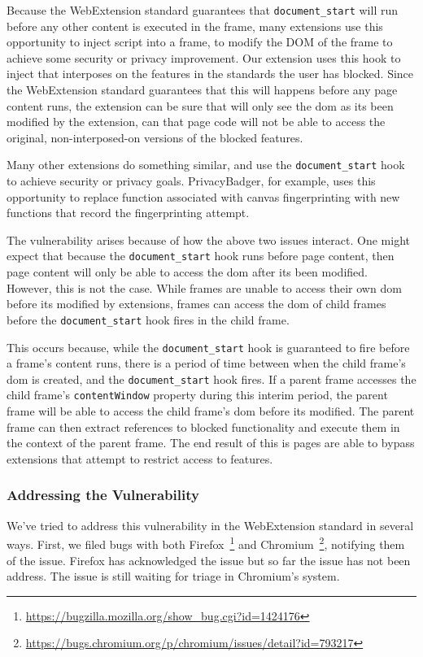 Because the WebExtension standard guarantees that \texttt{document\_start} will
run before any other content is executed in the frame, many extensions use
this opportunity to inject script into a frame, to modify the DOM of the frame
to achieve some security or privacy improvement.  Our extension uses this
hook to inject \JS that interposes on the features in the standards the user
has blocked.  Since the WebExtension standard guarantees that this will happens
before any page content runs, the extension can be sure that will only see
the \gls{dom} as its been modified by the extension, can that page code
will not be able to access the original, non-interposed-on versions of the
blocked features.

Many other extensions do something similar, and use the \texttt{document\_start}
hook to achieve security or privacy goals. PrivacyBadger, for example, uses
this opportunity to replace \WAPI function associated with canvas fingerprinting
with new functions that record the fingerprinting attempt.


The vulnerability arises because of how the above two issues interact.  One
might expect that because the \texttt{document\_start} hook runs before
page content, then page content will only be able to access the \gls{dom}
after its been modified.  However, this is not the case.  While frames are unable
to access their own \gls{dom} before its modified by extensions, frames can
access the \gls{dom} of child frames before the \texttt{document\_start}
hook fires in the child frame.

This occurs because, while the \texttt{document\_start} hook is guaranteed to
fire before a frame's content runs, there is a period of time between
when the child frame's \gls{dom} is created, and the \texttt{document\_start}
hook fires.  If a parent frame accesses the child frame's \texttt{contentWindow}
property during this interim period, the parent frame will be able to access
the child frame's \gls{dom} before its modified.  The parent frame
can then extract references to blocked functionality and execute them
in the context of the parent frame.  The end result of this is pages are able
to bypass extensions that attempt to restrict access to \WAPI features.


\subsubsection{Addressing the Vulnerability}
We've tried to address this vulnerability in the WebExtension standard in
several ways.  First, we filed bugs with both
Firefox~\footnote{\url{https://bugzilla.mozilla.org/show_bug.cgi?id=1424176}} and
Chromium~\footnote{\url{https://bugs.chromium.org/p/chromium/issues/detail?id=793217}},
notifying them of the issue.  Firefox has acknowledged the issue but so far
the issue has not been address.  The issue is still waiting for triage in
Chromium's system.

